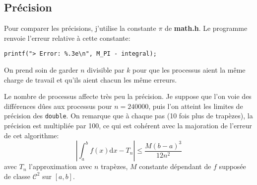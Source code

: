 \documentclass{article}
\begin{document}
\subsection{Précision}
Pour comparer les précisions, j'utilise la constante $\pi$ de \textbf{math.h}.
Le programme renvoie l'erreur relative à cette constante:
\begin{lstlisting}[style=ccode, morekeywords={f}]
printf("> Error: %.3e\n", M_PI - integral);
\end{lstlisting}
On prend soin de garder $n$ divisible par $k$ pour que les processus aient la même charge de travail et qu'ils aient chacun les même erreurs.

Le nombre de processus affecte très peu la précision. Je suppose que l'on voie des différences dûes aux processus pour $n=240000$, puis l'on atteint les limites de précision des \lstinline[style=ccode]|double|. On remarque que à chaque pas (10 fois plus de trapèzes), la précision est multipliée par 100, ce qui est cohérent avec la majoration de l'erreur de cet algorithme:
$$
\left|\int_{a}^{b}f(x)\mathrm{d}x -T_n \right| \leq \frac{M(b-a)^3}{12n^2}
$$
avec $T_n$ l'approximation avec $n$ trapèzes, $M$ constante dépendant de $f$ supposée de classe $\mathcal{C}^2$ sur $[a,b]$.
\end{document}
